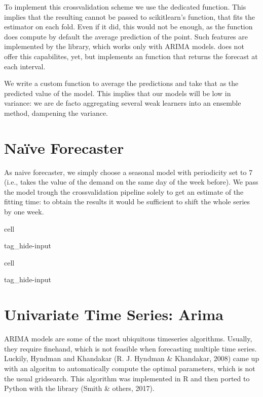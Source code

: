 \documentclass[letterpaper,10pt,english]{jupyterBook}
\begin{document}
\sphinxAtStartPar
To implement this cross\sphinxhyphen{}validation scheme we use the dedicated  function. This implies that the resulting  cannot be passed to scikit\sphinxhyphen{}learn’s  function, that fits the estimator on each fold. Even if it did, this would not be enough, as the function does  compute by default the average prediction of the point. Such features are implemented by the  library, which works only with ARIMA models.  does not offer this capabilites, yet, but implements an  function that returns the forecast at each interval.

\sphinxAtStartPar
We write a custom function to average the predictions and take that as the predicted value of the model. This implies that our models will be low in variance: we are de facto aggregating several weak learners into an ensemble method, dampening the variance.


\section{Naïve Forecaster}
\label{\detokenize{06-forecasting:naive-forecaster}}
\sphinxAtStartPar
As naive forecaster, we simply choose a seasonal model with periodicity set to 7 (i.e., takes the value of the demand on the same day of the week before). We pass the model trough the cross\sphinxhyphen{}validation pipeline solely to get an estimate of the fitting time: to obtain the results it would be sufficient to shift the whole series by one week.

\begin{sphinxuseclass}{cell}
\begin{sphinxuseclass}{tag_hide-input}
\end{sphinxuseclass}
\end{sphinxuseclass}
\begin{sphinxuseclass}{cell}
\begin{sphinxuseclass}{tag_hide-input}
\end{sphinxuseclass}
\end{sphinxuseclass}

\section{Univariate Time Series: Arima}
\label{\detokenize{06-forecasting:univariate-time-series-arima}}
\sphinxAtStartPar
ARIMA models are some of the most ubiquitous time\sphinxhyphen{}series algorithms. Usually, they require fine\sphinxhyphen{}hand, which is not feasible when forecasting multiple time series. Luckily, Hyndman and Khandakar (R. J. Hyndman \& Khandakar, 2008) came up with an algoritm to automatically compute the optimal parameters, which is not the usual grid\sphinxhyphen{}search. This algorithm was implemented in R and then ported to Python with the  library (Smith \& others, 2017).
\end{document}
